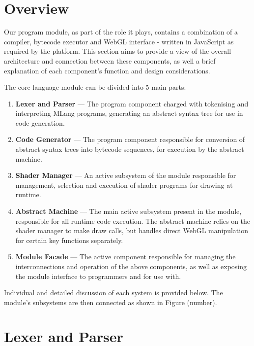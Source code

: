 \documentclass{l3proj}
\begin{document}
\section{Overview}
\label{arch-over}

Our program module, as part of the role it plays, contains a combination of a compiler, bytecode executor and WebGL interface - written in JavaScript as required by the platform. This section aims to provide a view of the overall architecture and connection between these components, as well a brief explanation of each component's function and design considerations.

The core language module can be divided into 5 main parts:
\begin{enumerate}
\item \textbf{Lexer and Parser} --- The program component charged with tokenising and interpreting MLang programs, generating an abstract syntax tree for use in code generation.
\item \textbf{Code Generator} --- The program component responsible for conversion of abstract syntax trees into bytecode sequences, for execution by the abstract machine.
\item \textbf{Shader Manager} --- An active subsystem of the module responsible for management, selection and execution of shader programs for drawing at runtime.
\item \textbf{Abstract Machine} --- The main active subsystem present in the module, responsible for all runtime code execution. The abstract machine relies on the shader manager to make draw calls, but handles direct WebGL manipulation for certain key functions separately.
\item \textbf{Module Facade} --- The active component responsible for managing the interconnections and operation of the above components, as well as exposing the module interface to programmers and for use with.
\end{enumerate}
Individual and detailed discussion of each system is provided below. The module's subsystems are then connected as shown in Figure (number).

\section{Lexer and Parser}
\label{arch-lex}
\end{document}
